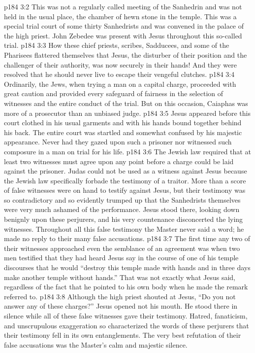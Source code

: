 \vs p184 3:2 This was not a regularly called meeting of the Sanhedrin and was not held in the usual place, the chamber of hewn stone in the temple. This was a special trial court of some thirty Sanhedrists and was convened in the palace of the high priest. John Zebedee was present with Jesus throughout this so\hyp{}called trial.
\vs p184 3:3 How these chief priests, scribes, Sadducees, and some of the Pharisees flattered themselves that Jesus, the disturber of their position and the challenger of their authority, was now securely in their hands! And they were resolved that he should never live to escape their vengeful clutches.
\vs p184 3:4 Ordinarily, the Jews, when trying a man on a capital charge, proceeded with great caution and provided every safeguard of fairness in the selection of witnesses and the entire conduct of the trial. But on this occasion, Caiaphas was more of a prosecutor than an unbiased judge.
\vs p184 3:5 \pc Jesus appeared before this court clothed in his usual garments and with his hands bound together behind his back. The entire court was startled and somewhat confused by his majestic appearance. Never had they gazed upon such a prisoner nor witnessed such composure in a man on trial for his life.
\vs p184 3:6 \pc The Jewish law required that at least two witnesses must agree upon any point before a charge could be laid against the prisoner. Judas could not be used as a witness against Jesus because the Jewish law specifically forbade the testimony of a traitor. More than a score of false witnesses were on hand to testify against Jesus, but their testimony was so contradictory and so evidently trumped up that the Sanhedrists themselves were very much ashamed of the performance. Jesus stood there, looking down benignly upon these perjurers, and his very countenance disconcerted the lying witnesses. Throughout all this false testimony the Master never said a word; he made no reply to their many false accusations.
\vs p184 3:7 The first time any two of their witnesses approached even the semblance of an agreement was when two men testified that they had heard Jesus say in the course of one of his temple discourses that he would “destroy this temple made with hands and in three days make another temple without hands.” That was not exactly what Jesus said, regardless of the fact that he pointed to his own body when he made the remark referred to.
\vs p184 3:8 Although the high priest shouted at Jesus, “Do you not answer any of these charges?” Jesus opened not his mouth. He stood there in silence while all of these false witnesses gave their testimony. Hatred, fanaticism, and unscrupulous exaggeration so characterized the words of these perjurers that their testimony fell in its own entanglements. The very best refutation of their false accusations was the Master’s calm and majestic silence.
